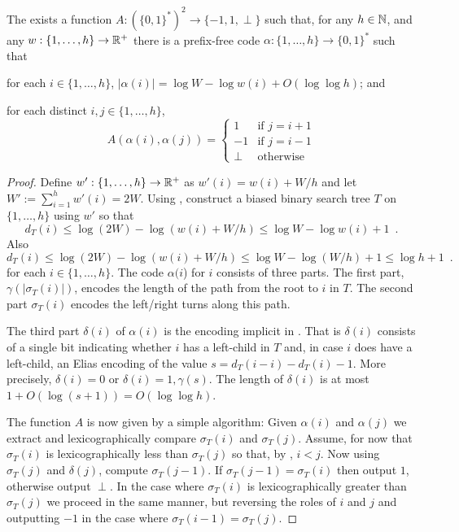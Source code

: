 \documentclass[kpfonts]{patmorin}
\begin{document}
\begin{lem}
  The exists a function $A:(\{0,1\}^*)^2\to\{-1,1,\perp\}$ such that, for any $h\in\mathbb{N}$, and any $w:\{1,\ldots,h\}\to\mathbb{R}^+$ there is a prefix-free code $\alpha:\{1,\ldots,h\}\to \{0,1\}^*$ such that 
  \begin{compactenum}
    \item for each $i\in\{1,\ldots,h\}$, $|\alpha(i)|=\log W -\log w(i) + O(\log\log h)$; and
    \item for each distinct $i,j\in\{1,\ldots,h\}$, 
    \[   A(\alpha(i),\alpha(j)) 
    = \begin{cases}
       1 & \text{if $j=i+1$} \\
       -1 & \text{if $j=i-1$} \\
       \perp & \text{otherwise}
      \end{cases}
      \]
    \end{compactenum}
\end{lem}


\begin{proof}
  Define $w':\{1,\ldots,h\}\to \mathbb{R}^+$ as $w'(i)=w(i)+W/h$ and let $W':=\sum_{i=1}^h w'(i)=2W$.
  Using , construct a biased binary search tree $T$ on $\{1,\ldots,h\}$ using $w'$ so that 
  \[   
    d_T(i)\le\log (2W)-\log(w(i)+W/h) \le \log W-\log w(i)+1 \enspace .
  \]
  Also
  \[
  d_T(i)\le\log (2W)-\log(w(i)+W/h) \le \log W-\log (W/h)+1 \le \log h + 1\enspace .
  \]
  for each $i\in\{1,\ldots,h\}$.  The code $\alpha(i$) for $i$ consists of three parts.  The first part, $\gamma(|\sigma_T(i)|)$, encodes the length of the path from the root to $i$ in $T$. The second part $\sigma_T(i)$ encodes the left/right turns along this path.  
  
  The third part $\delta(i)$ of $\alpha(i)$ is the encoding implicit in .  That is $\delta(i)$ consists of
  a single bit indicating whether $i$ has a left-child in $T$ and, in case $i$ does have a left-child, an Elias encoding of the value $s=d_T(i-i)-d_T(i)-1$.  More precisely, $\delta(i)=0$ or $\delta(i)=1,\gamma(s)$.  The length of $\delta(i)$ is at most $1+O(\log(s+1))=O(\log\log h)$.

  The function $A$ is now given by a simple algorithm: Given $\alpha(i)$ and $\alpha(j)$ we extract and lexicographically compare $\sigma_T(i)$ and $\sigma_T(j)$.  Assume, for now that $\sigma_T(i)$ is lexicographically less than $\sigma_T(j)$ so that, by , $i < j$.  Now using $\sigma_T(j)$ and $\delta(j)$, compute $\sigma_T(j-1)$.  If $\sigma_T(j-1)=\sigma_T(i)$ then output $1$, otherwise output $\perp$.
  In the case where $\sigma_T(i)$ is lexicographically greater than $\sigma_T(j)$ we proceed in the same manner, but reversing the roles of $i$ and $j$ and outputting $-1$ in the case where $\sigma_T(i-1)=\sigma_T(j)$.
\end{proof}
\end{document}

